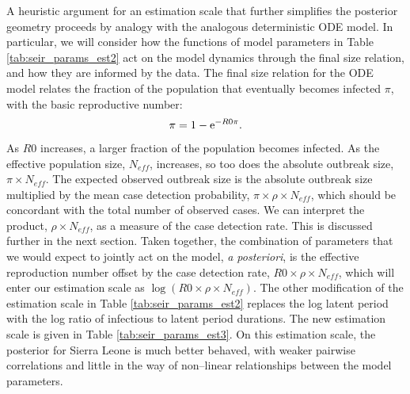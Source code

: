 A heuristic argument for an estimation scale that further simplifies the posterior geometry proceeds by analogy with the analogous deterministic ODE model. In particular, we will consider how the functions of model parameters in Table \ref{tab:seir_params_est2} act on the model dynamics through the final size relation, and how they are informed by the data. The final size relation for the ODE model \cite{miller2012note} relates the fraction of the population that eventually becomes infected $ \pi $, with the basic reproductive number:
\begin{equation}
\label{eqn:final_size_relation}
\pi = 1 - \mathrm{e}^{-R0\pi}.
\end{equation}
As $ R0 $ increases, a larger fraction of the population becomes infected. As the effective population size, $ N_{eff}$, increases, so too does the absolute outbreak size, $ \pi \times N_{eff} $. The expected observed outbreak size is the absolute outbreak size multiplied by the mean case detection probability, $ \pi \times \rho \times N_{eff} $, which should be concordant with the total number of observed cases. We can interpret the product, $ \rho \times N_{eff} $, as a measure of the case detection rate. This is discussed further in the next section. Taken together, the combination of parameters that we would expect to jointly act on the model, \textit{a posteriori}, is the effective reproduction number offset by the case detection rate, $ R0\times\rho \times N_{eff} $, which will enter our estimation scale as $ \log(R0\times\rho\times N_{eff}) $. The other modification of the estimation scale in Table \ref{tab:seir_params_est2} replaces the log latent period with the log ratio of infectious to latent period durations. The new estimation scale is given in Table \ref{tab:seir_params_est3}. On this estimation scale, the posterior for Sierra Leone is much better behaved, with weaker pairwise correlations and little in the way of non--linear relationships between the model parameters. 

